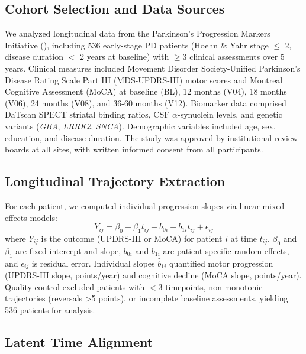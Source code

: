 \subsection{Cohort Selection and Data Sources}

We analyzed longitudinal data from the Parkinson's Progression Markers Initiative (\ppmi)\cite{marek2011ppmi}, including 536 early-stage PD patients (Hoehn \& Yahr stage $\leq$ 2, disease duration $<$ 2 years at baseline) with $\geq$3 clinical assessments over 5 years. Clinical measures included Movement Disorder Society-Unified Parkinson's Disease Rating Scale Part III (MDS-UPDRS-III) motor scores\cite{goetz2008movement} and Montreal Cognitive Assessment (MoCA)\cite{nasreddine2005moca} at baseline (BL), 12 months (V04), 18 months (V06), 24 months (V08), and 36-60 months (V12). Biomarker data comprised DaTscan SPECT striatal binding ratios, CSF $\alpha$-synuclein levels, and genetic variants (\textit{GBA}, \textit{LRRK2}, \textit{SNCA})\cite{nalls2019identification}. Demographic variables included age, sex, education, and disease duration. The study was approved by institutional review boards at all \ppmi{} sites, with written informed consent from all participants.

\subsection{Longitudinal Trajectory Extraction}

For each patient, we computed individual progression slopes via linear mixed-effects models\cite{bates2015lme4}:
\begin{equation}
Y_{ij} = \beta_0 + \beta_1 t_{ij} + b_{0i} + b_{1i} t_{ij} + \epsilon_{ij}
\end{equation}
where $Y_{ij}$ is the outcome (UPDRS-III or MoCA) for patient $i$ at time $t_{ij}$, $\beta_0$ and $\beta_1$ are fixed intercept and slope, $b_{0i}$ and $b_{1i}$ are patient-specific random effects, and $\epsilon_{ij}$ is residual error. Individual slopes $\hat{b}_{1i}$ quantified motor progression (UPDRS-III slope, points/year) and cognitive decline (MoCA slope, points/year). Quality control excluded patients with $<$3 timepoints, non-monotonic trajectories (reversals >5 points), or incomplete baseline assessments, yielding 536 patients for analysis.

\subsection{Latent Time Alignment}

